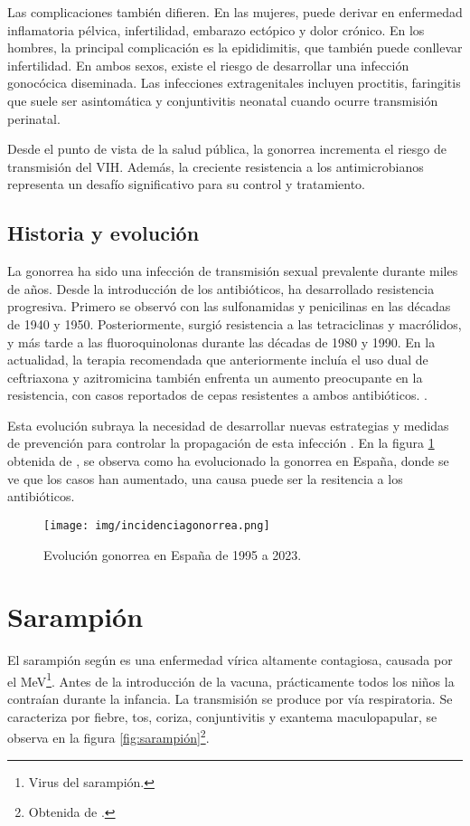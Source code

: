 Las complicaciones también difieren. En las mujeres, puede derivar en enfermedad inflamatoria pélvica, infertilidad, embarazo ectópico y dolor crónico. En los hombres, la principal complicación es la epididimitis, que también puede conllevar infertilidad. En ambos sexos, existe el riesgo de desarrollar una infección gonocócica diseminada. Las infecciones extragenitales incluyen proctitis, faringitis que suele ser asintomática y conjuntivitis neonatal cuando ocurre transmisión perinatal.

Desde el punto de vista de la salud pública, la gonorrea incrementa el riesgo de transmisión del VIH. Además, la creciente resistencia a los antimicrobianos representa un desafío significativo para su control y tratamiento.

\subsection{Historia y evolución}
La gonorrea ha sido una infección de transmisión sexual prevalente durante miles de años. Desde la introducción de los antibióticos, ha desarrollado resistencia progresiva. Primero se observó con las sulfonamidas y penicilinas en las décadas de 1940 y 1950. Posteriormente, surgió resistencia a las tetraciclinas y macrólidos, y más tarde a las fluoroquinolonas durante las décadas de 1980 y 1990. En la actualidad, la terapia recomendada que anteriormente incluía el uso dual de ceftriaxona y azitromicina también enfrenta un aumento preocupante en la resistencia, con casos reportados de cepas resistentes a ambos antibióticos. \cite{golparian2020genomic}.

Esta evolución subraya la necesidad de desarrollar nuevas estrategias y medidas de prevención para controlar la propagación de esta infección \cite{lin2021epidemiology}.
En la figura \ref{fig:evolución gonorrea} obtenida de \cite{isanidad2023}, se observa como ha evolucionado la gonorrea en España, donde se ve que los casos han aumentado, una causa puede ser la resitencia a los antibióticos.

\begin{figure}[H]
    \centering
    \texttt{[image: img/incidenciagonorrea.png]}
    \caption{Evolución gonorrea en España de 1995 a 2023.}
    \label{fig:evolución gonorrea}
    \vspace{0.5cm} %
\end{figure}


\section{Sarampión}
El sarampión según \cite{workowski2021sexually}es una enfermedad vírica altamente contagiosa, causada por el MeV\footnote{Virus del sarampión.}. Antes de la introducción de la vacuna, prácticamente todos los niños la contraían durante la infancia. La transmisión se produce por vía respiratoria. Se caracteriza por fiebre, tos, coriza, conjuntivitis y exantema maculopapular, se observa en la figura \ref{fig:sarampión}\footnote{Obtenida de \cite{tododiagnostico2020sarampion}.}.

